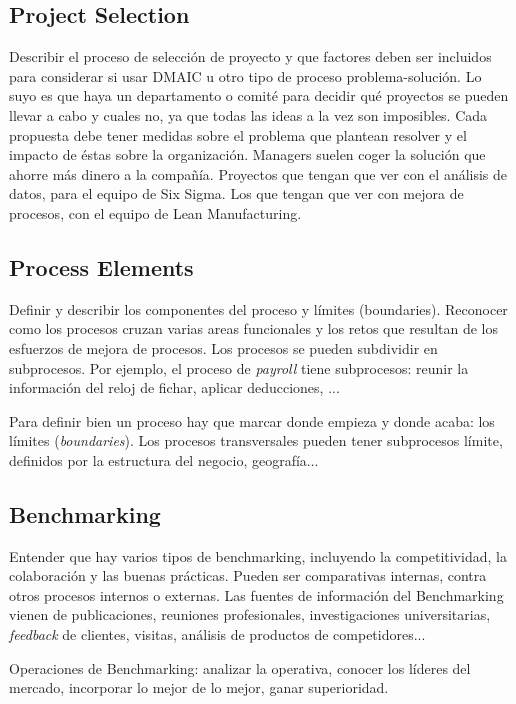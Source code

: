 \documentclass[]{article}
\begin{document}
\subsection{Project Selection}

Describir el proceso de selección de proyecto y que factores deben ser incluidos para considerar si usar DMAIC u otro tipo de proceso problema-solución. Lo suyo es que haya un departamento o comité para decidir qué proyectos se pueden llevar a cabo y cuales no, ya que todas las ideas a la vez son imposibles. Cada propuesta debe tener medidas sobre el problema que plantean resolver y el impacto de éstas sobre la organización. Managers suelen coger la solución que ahorre más dinero a la compañía. \newline
Proyectos que tengan que ver con el análisis de datos, para el equipo de Six Sigma. Los que tengan que ver con mejora de procesos, con el equipo de Lean Manufacturing.

\subsection{Process Elements}

Definir y describir los componentes del proceso	y límites (boundaries). Reconocer como los procesos cruzan varias areas funcionales y los retos que resultan de los esfuerzos de mejora de procesos. Los procesos se pueden subdividir en subprocesos.
Por ejemplo, el proceso de \textit{payroll} tiene subprocesos: reunir la información del reloj de fichar, aplicar deducciones, ...

Para definir bien un proceso hay que marcar donde empieza y donde acaba: los límites (\textit{boundaries}). Los procesos transversales pueden tener subprocesos límite, definidos por la estructura del negocio, geografía...

\subsection{Benchmarking}

Entender que hay varios tipos de benchmarking, incluyendo la competitividad, la colaboración y las buenas prácticas.
Pueden ser comparativas internas, contra otros procesos internos o externas. Las fuentes de información del Benchmarking vienen de publicaciones, reuniones profesionales, investigaciones universitarias, \textit{feedback} de clientes, visitas, análisis de productos de competidores...

Operaciones de Benchmarking: analizar la operativa, conocer los líderes del mercado, incorporar lo mejor de lo mejor, ganar superioridad. 
\end{document}
